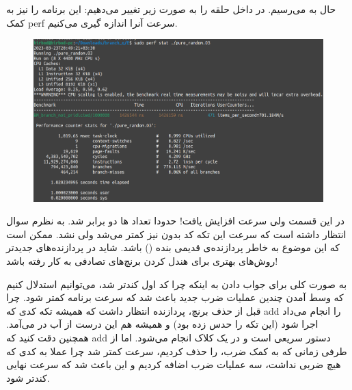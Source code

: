 \begin{enumerate}
    حال به 
    می‌رسیم. در داخل حلقه را به صورت زیر تغییر می‌دهیم:
    این برنامه را نیز به کمک perf
    سرعت آنرا اندازه گیری می‌کنیم.
    \begin{figure}[H]
        \centerline{\includegraphics[scale=0.35]{pics/5/E/pure_random_no_branch.png}}
    \end{figure}
    در این قسمت ولی سرعت افزایش یافت! حدودا تعداد ها
    دو برابر شد. به نظرم سوال انتظار داشته است که سرعت این تکه کد بدون 
    نیز کمتر می‌شد ولی نشد. ممکن است که این موضوع به خاطر پردازنده‌ی قدیمی بنده
    ()
    باشد. شاید در پردازنده‌های جدیدتر روش‌های بهتری برای هندل کردن برنچ‌های تصادفی به کار رفته باشد!

    به صورت کلی برای جواب دادن به اینکه چرا کد اول کندتر شد، می‌توانیم استدلال کنیم که وسط آمدن چندین
    عملیات ضرب جدید باعث شد که سرعت برنامه کمتر شود. چرا قبل از حذف برنچ، پردازنده انتظار داشت که
    همیشه تکه کدی که add را انجام می‌داد اجرا شود (این تکه را حدس زده بود)
    و همیشه هم این
    درست از آب در می‌آمد. همچنین دقت کنید که add
    دستور سریعی است و در یک کلاک انجام می‌شود. اما از طرفی زمانی که به کمک ضرب،
    را حذف کردیم، سرعت کمتر شد چرا عملا به کدی که هیچ ضربی نداشت،‌ سه عملیات ضرب اضافه کردیم و
    این باعث شد که سرعت نهایی کندتر شود.


\end{enumerate}
